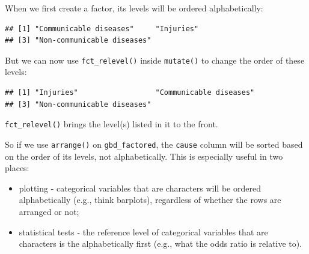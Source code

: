 \documentclass[
  12pt,
  krantz2]{krantz}
\makeatletter
\newenvironment{Shaded}{\begin{snugshade}}{\end{snugshade}}
\newcommand{\DataTypeTok}[1]{\textcolor[rgb]{0.13,0.29,0.53}{#1}}
\newcommand{\KeywordTok}[1]{\textcolor[rgb]{0.13,0.29,0.53}{\textbf{#1}}}
\newcommand{\NormalTok}[1]{#1}
\newcommand{\OperatorTok}[1]{\textcolor[rgb]{0.81,0.36,0.00}{\textbf{#1}}}
\newcommand{\StringTok}[1]{\textcolor[rgb]{0.31,0.60,0.02}{#1}}
\providecommand{\tightlist}{%
  \setlength{\itemsep}{0pt}\setlength{\parskip}{0pt}}
\newenvironment{kframe}{%
\medskip{}
\setlength{\fboxsep}{.8em}
 \def\at@end@of@kframe{}%
 \ifinner\ifhmode%
  \def\at@end@of@kframe{\end{minipage}}%
  \begin{minipage}{\columnwidth}%
 \fi\fi%
 \def\FrameCommand##1{\hskip\@totalleftmargin \hskip-\fboxsep
 \colorbox{shadecolor}{##1}\hskip-\fboxsep
     \hskip-\linewidth \hskip-\@totalleftmargin \hskip\columnwidth}%
 \MakeFramed {\advance\hsize-\width
   \@totalleftmargin\z@ \linewidth\hsize
   \@setminipage}}%
 {\par\unskip\endMakeFramed%
 \at@end@of@kframe}
\renewenvironment{Shaded}{\begin{kframe}}{\end{kframe}}
\makeatother
\begin{document}
When we first create a factor, its levels will be ordered alphabetically:

\begin{Shaded}
\end{Shaded}

\begin{verbatim}
## [1] "Communicable diseases"     "Injuries"                 
## [3] "Non-communicable diseases"
\end{verbatim}

But we can now use \texttt{fct\_relevel()} inside \texttt{mutate()} to change the order of these levels:

\begin{Shaded}
\end{Shaded}

\begin{verbatim}
## [1] "Injuries"                  "Communicable diseases"    
## [3] "Non-communicable diseases"
\end{verbatim}

\texttt{fct\_relevel()} brings the level(s) listed in it to the front.

So if we use \texttt{arrange()} on \texttt{gbd\_factored}, the \texttt{cause} column will be sorted based on the order of its levels, not alphabetically.
This is especially useful in two places:

\begin{itemize}
\tightlist
\item
  plotting - categorical variables that are characters will be ordered alphabetically (e.g., think barplots), regardless of whether the rows are arranged or not;
\item
  statistical tests - the reference level of categorical variables that are characters is the alphabetically first (e.g., what the odds ratio is relative to).
\end{itemize}
\end{document}
